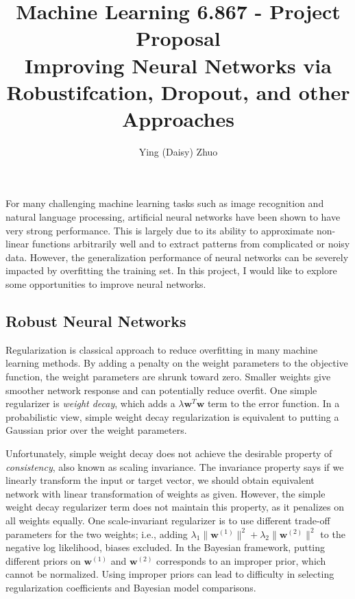 \documentclass[twoside,12pt]{article}
\newcommand{\M}[1]{\boldsymbol{\mathbf{#1}}}
\begin{document}
\title{Machine Learning 6.867 - Project Proposal\\Improving Neural Networks via Robustifcation, Dropout, and other Approaches }
\author{Ying (Daisy) Zhuo}

\maketitle

For many challenging machine learning tasks such as image recognition and natural language processing, artificial neural networks have been shown to have very strong performance. This is largely due to its ability to approximate non-linear functions arbitrarily well and to extract patterns from complicated or noisy data. However, the generalization performance of neural networks can be severely impacted by overfitting the training set. In this project, I would like to explore some opportunities to improve neural networks. %

\subsection{Robust Neural Networks}

Regularization is classical approach to reduce overfitting in many machine learning methods. By adding a penalty on the weight parameters to the objective function, the weight parameters are shrunk toward zero. Smaller weights give smoother network response and can potentially reduce overfit. One simple regularizer is \emph{weight decay}, which adds a $\lambda \M w ^T \M w$ term to the error function. In a probabilistic view, simple weight decay regularization is equivalent to putting a Gaussian prior over the weight parameters. 

Unfortunately, simple weight decay does not achieve the desirable property of \emph{consistency}, also known as scaling invariance. The invariance property says if we linearly transform the input or target vector, we should obtain equivalent network with linear transformation of weights as given. However, the simple weight decay regularizer term does not maintain this property, as it penalizes on all weights equally. One scale-invariant regularizer is to use different trade-off parameters for the two weights; i.e., adding $\lambda_1 \| \M w^{(1)}\|^2 + \lambda_2 \| \M w^{(2)}\|^2$ to the negative log likelihood, biases excluded. In the Bayesian framework, putting different priors on $\M w^{(1)}$ and $\M w^{(2)}$ corresponds to an improper prior, which cannot be normalized. Using improper priors can lead to difficulty in selecting regularization coefficients and Bayesian model comparisons. 
\end{document}
